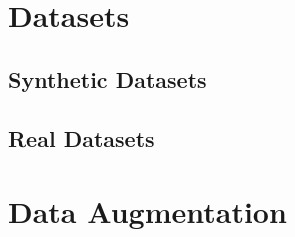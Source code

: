 \label{chapter:data-preparation}


\section{Datasets}

\subsection{Synthetic Datasets}

\subsection{Real Datasets}

\section{Data Augmentation}
